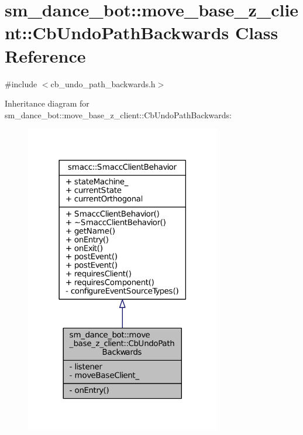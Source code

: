 \hypertarget{classsm__dance__bot_1_1move__base__z__client_1_1CbUndoPathBackwards}{}\section{sm\+\_\+dance\+\_\+bot\+:\+:move\+\_\+base\+\_\+z\+\_\+client\+:\+:Cb\+Undo\+Path\+Backwards Class Reference}
\label{classsm__dance__bot_1_1move__base__z__client_1_1CbUndoPathBackwards}


{\ttfamily \#include $<$cb\+\_\+undo\+\_\+path\+\_\+backwards.\+h$>$}



Inheritance diagram for sm\+\_\+dance\+\_\+bot\+:\+:move\+\_\+base\+\_\+z\+\_\+client\+:\+:Cb\+Undo\+Path\+Backwards\+:
\nopagebreak
\begin{figure}[H]
\begin{center}
\leavevmode
\includegraphics[width=242pt]{classsm__dance__bot_1_1move__base__z__client_1_1CbUndoPathBackwards__inherit__graph}
\end{center}
\end{figure}


